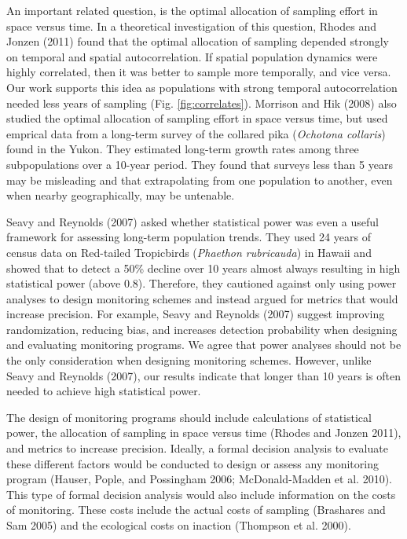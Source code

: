 \documentclass[12pt,]{article}
\begin{document}
An important related question, is the optimal allocation of sampling
effort in space versus time. In a theoretical investigation of this
question, Rhodes and Jonzen (2011) found that the optimal allocation of
sampling depended strongly on temporal and spatial autocorrelation. If
spatial population dynamics were highly correlated, then it was better
to sample more temporally, and vice versa. Our work supports this idea
as populations with strong temporal autocorrelation needed less years of
sampling (Fig. \ref{fig:correlates}). Morrison and Hik (2008) also
studied the optimal allocation of sampling effort in space versus time,
but used emprical data from a long-term survey of the collared pika
(\emph{Ochotona collaris}) found in the Yukon. They estimated long-term
growth rates among three subpopulations over a 10-year period. They
found that surveys less than 5 years may be misleading and that
extrapolating from one population to another, even when nearby
geographically, may be untenable.

Seavy and Reynolds (2007) asked whether statistical power was even a
useful framework for assessing long-term population trends. They used 24
years of census data on Red-tailed Tropicbirds
(\emph{Phaethon rubricauda}) in Hawaii and showed that to detect a 50\%
decline over 10 years almost always resulting in high statistical power
(above 0.8). Therefore, they cautioned against only using power analyses
to design monitoring schemes and instead argued for metrics that would
increase precision. For example, Seavy and Reynolds (2007) suggest
improving randomization, reducing bias, and increases detection
probability when designing and evaluating monitoring programs. We agree
that power analyses should not be the only consideration when designing
monitoring schemes. However, unlike Seavy and Reynolds (2007), our
results indicate that longer than 10 years is often needed to achieve
high statistical power.

The design of monitoring programs should include calculations of
statistical power, the allocation of sampling in space versus time
(Rhodes and Jonzen 2011), and metrics to increase precision. Ideally, a
formal decision analysis to evaluate these different factors would be
conducted to design or assess any monitoring program (Hauser, Pople, and
Possingham 2006; McDonald-Madden et al. 2010). This type of formal
decision analysis would also include information on the costs of
monitoring. These costs include the actual costs of sampling (Brashares
and Sam 2005) and the ecological costs on inaction (Thompson et al.
2000).
\end{document}
